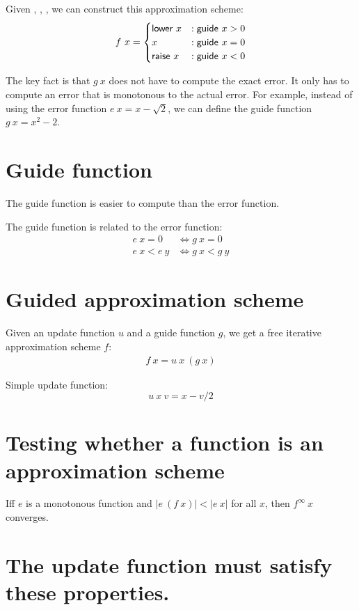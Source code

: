 Given , , , we can construct this approximation scheme:
\begin{align*}
    f~x = \begin{cases}
        \textsf{lower}~x &: \textsf{guide}~x > 0
        \\ x &: \textsf{guide}~x = 0
        \\ \textsf{raise}~x &: \textsf{guide}~x < 0
    \end{cases}
\end{align*}

The key fact is that \(g~x\) does not have to compute the exact error.
It only has to compute an error that is monotonous to the actual error.
For example, instead of using the error function \(e~x = x - \sqrt{2}\),
we can define the guide function \(g~x = x^2 - 2\).

\section{Guide function}

The guide function is easier to compute than the error function.

The guide function is related to the error function:
\begin{align*}
    e~x = 0 &\iff g~x = 0
    \\
    e~x < e~y &\iff g~x < g~y
\end{align*}

\section{Guided approximation scheme}

Given an update function \(u\) and a guide function \(g\),
we get a free iterative approximation scheme \(f\):
\begin{align*}
    f~x = u~x~(g~x)
\end{align*}

Simple update function:
\[
    u~x~v = x - v/2
\]

\section{Testing whether a function is an approximation scheme}

Iff \(e\) is a monotonous function
and \(|e~(f~x)| < |e~x|\) for all \(x\),
then \(f^\infty~x\) converges.

\section{The update function must satisfy these properties.}

